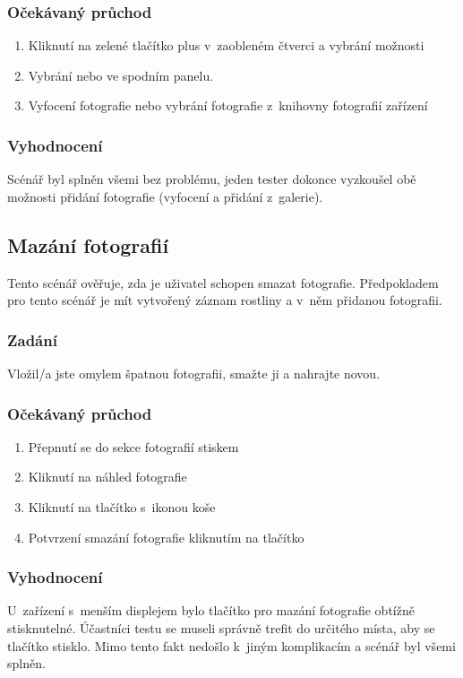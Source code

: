 \documentclass[thesis=M,czech]{FITthesis}[2019/12/23]
\begin{document}
\subsubsection*{Očekávaný průchod}
\begin{enumerate}
    \item Kliknutí na zelené tlačítko plus v~zaobleném čtverci a vybrání možnosti 
    \item Vybrání  nebo  ve spodním panelu.
    \item Vyfocení fotografie nebo vybrání fotografie z~knihovny fotografií zařízení
\end{enumerate}
\subsubsection*{Vyhodnocení}
Scénář byl splněn všemi bez problému, jeden tester dokonce vyzkoušel obě možnosti přidání fotografie (vyfocení a přidání z~galerie).

\subsection{Mazání fotografií}
Tento scénář ověřuje, zda je uživatel schopen smazat fotografie. Předpokladem pro tento scénář je mít vytvořený záznam rostliny a v~něm přidanou fotografii.
\subsubsection*{Zadání}
Vložil/a jste omylem špatnou fotografii, smažte ji a nahrajte novou.
\subsubsection*{Očekávaný průchod}
\begin{enumerate}
    \item Přepnutí se do sekce fotografií stiskem 
    \item Kliknutí na náhled fotografie
    \item Kliknutí na tlačítko s~ikonou koše
    \item Potvrzení smazání fotografie kliknutím na tlačítko 
\end{enumerate}
\subsubsection*{Vyhodnocení}
U~zařízení s~menším displejem bylo tlačítko pro mazání fotografie obtížně stisknutelné. Účastníci testu se museli správně trefit do určitého místa, aby se tlačítko stisklo. Mimo tento fakt nedošlo k~jiným komplikacím a scénář byl všemi splněn.
\end{document}

